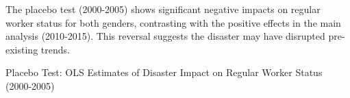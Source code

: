 \documentclass[serif, aspectratio=169]{beamer}
\newcommand{\returnbutton}[2]{%
  \vspace{-1.0cm}  %
  \hfill  %
  \hyperlink{#1}{%
    {\footnotesize\beamerbutton{#2}}%
  }%
  \vspace{0.3cm}  %
}
\begin{document}
\begin{frame}[label=regular_placebo]

The placebo test (2000-2005) shows significant negative impacts on regular worker status for both genders, contrasting with the positive effects in the main analysis (2010-2015). This reversal suggests the disaster may have disrupted pre-existing trends.


\vspace{-1.0cm}
\returnbutton{regular_status}{Return}
\vspace{1.2cm}

\begin{table}[htbp]
\centering
\caption{Placebo Test: OLS Estimates of Disaster Impact on Regular Worker Status (2000-2005)}

\vspace{-0.2cm}



\end{table}
\end{frame}
\end{document}
